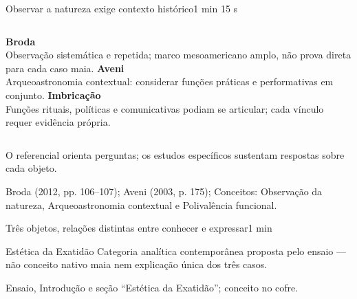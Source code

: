 \documentclass[aspectratio=169,11pt]{beamer}
\newcommand{\source}[1]{\vfill{\tiny\color{mayaInk!70}#1}}
\newcommand{\minutes}[1]{\hfill{\scriptsize\color{mayaJade}#1}}
\begin{document}
\begin{frame}{Observar a natureza exige contexto histórico}\minutes{1 min 15 s}
  \begin{columns}[T,onlytextwidth]
      \textcolor{mayaJade}{\Large\textbf{Broda}}\\
      Observação sistemática e repetida; marco mesoamericano amplo, não prova direta para cada caso maia.
      \textcolor{mayaJade}{\Large\textbf{Aveni}}\\
      Arqueoastronomia contextual: considerar funções práticas e performativas em conjunto.
      \textcolor{mayaJade}{\Large\textbf{Imbricação}}\\
      Funções rituais, políticas e comunicativas podiam se articular; cada vínculo requer evidência própria.
  \end{columns}
  \vspace{7mm}
  \begin{center}\small\color{mayaInk!75}O referencial orienta perguntas; os estudos específicos sustentam respostas sobre cada objeto.\end{center}
  \source{Broda (2012, pp. 106–107); Aveni (2003, p. 175); Conceitos: Observação da natureza, Arqueoastronomia contextual e Polivalência funcional.}
\end{frame}

\begin{frame}{Três objetos, relações distintas entre conhecer e expressar}\minutes{1 min}
  \centering
  \vspace{3mm}
  \begin{alertblock}{Estética da Exatidão}
    Categoria analítica contemporânea proposta pelo ensaio — não conceito nativo maia nem explicação única dos três casos.
  \end{alertblock}
  \source{Ensaio, Introdução e seção “Estética da Exatidão”; conceito no cofre.}
\end{frame}
\end{document}
